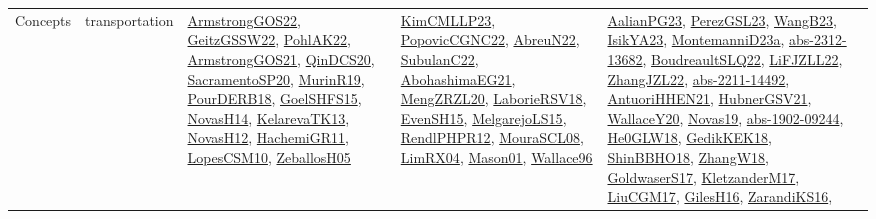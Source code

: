 {\begin{longtable}{llp{6cm}p{6cm}p{6cm}}
Concepts & transportation & \href{papers/ArmstrongGOS22.pdf}{ArmstrongGOS22}\cite{ArmstrongGOS22}, \href{papers/GeitzGSSW22.pdf}{GeitzGSSW22}\cite{GeitzGSSW22}, \href{articles/PohlAK22.pdf}{PohlAK22}\cite{PohlAK22}, \href{papers/ArmstrongGOS21.pdf}{ArmstrongGOS21}\cite{ArmstrongGOS21}, \href{articles/QinDCS20.pdf}{QinDCS20}\cite{QinDCS20}, \href{articles/SacramentoSP20.pdf}{SacramentoSP20}\cite{SacramentoSP20}, \href{papers/MurinR19.pdf}{MurinR19}\cite{MurinR19}, \href{articles/PourDERB18.pdf}{PourDERB18}\cite{PourDERB18}, \href{articles/GoelSHFS15.pdf}{GoelSHFS15}\cite{GoelSHFS15}, \href{articles/NovasH14.pdf}{NovasH14}\cite{NovasH14}, \href{papers/KelarevaTK13.pdf}{KelarevaTK13}\cite{KelarevaTK13}, \href{articles/NovasH12.pdf}{NovasH12}\cite{NovasH12}, \href{articles/HachemiGR11.pdf}{HachemiGR11}\cite{HachemiGR11}, \href{articles/LopesCSM10.pdf}{LopesCSM10}\cite{LopesCSM10}, \href{articles/ZeballosH05.pdf}{ZeballosH05}\cite{ZeballosH05} & \href{papers/KimCMLLP23.pdf}{KimCMLLP23}\cite{KimCMLLP23}, \href{papers/PopovicCGNC22.pdf}{PopovicCGNC22}\cite{PopovicCGNC22}, \href{articles/AbreuN22.pdf}{AbreuN22}\cite{AbreuN22}, \href{articles/SubulanC22.pdf}{SubulanC22}\cite{SubulanC22}, \href{articles/AbohashimaEG21.pdf}{AbohashimaEG21}\cite{AbohashimaEG21}, \href{articles/MengZRZL20.pdf}{MengZRZL20}\cite{MengZRZL20}, \href{articles/LaborieRSV18.pdf}{LaborieRSV18}\cite{LaborieRSV18}, \href{papers/EvenSH15.pdf}{EvenSH15}\cite{EvenSH15}, \href{papers/MelgarejoLS15.pdf}{MelgarejoLS15}\cite{MelgarejoLS15}, \href{papers/RendlPHPR12.pdf}{RendlPHPR12}\cite{RendlPHPR12}, \href{papers/MouraSCL08.pdf}{MouraSCL08}\cite{MouraSCL08}, \href{papers/LimRX04.pdf}{LimRX04}\cite{LimRX04}, \href{articles/Mason01.pdf}{Mason01}\cite{Mason01}, \href{articles/Wallace96.pdf}{Wallace96}\cite{Wallace96} & \href{papers/AalianPG23.pdf}{AalianPG23}\cite{AalianPG23}, \href{papers/PerezGSL23.pdf}{PerezGSL23}\cite{PerezGSL23}, \href{papers/WangB23.pdf}{WangB23}\cite{WangB23}, \href{articles/IsikYA23.pdf}{IsikYA23}\cite{IsikYA23}, \href{articles/MontemanniD23a.pdf}{MontemanniD23a}\cite{MontemanniD23a}, \href{articles/abs-2312-13682.pdf}{abs-2312-13682}\cite{abs-2312-13682}, \href{papers/BoudreaultSLQ22.pdf}{BoudreaultSLQ22}\cite{BoudreaultSLQ22}, \href{papers/LiFJZLL22.pdf}{LiFJZLL22}\cite{LiFJZLL22}, \href{papers/ZhangJZL22.pdf}{ZhangJZL22}\cite{ZhangJZL22}, \href{articles/abs-2211-14492.pdf}{abs-2211-14492}\cite{abs-2211-14492}, \href{papers/AntuoriHHEN21.pdf}{AntuoriHHEN21}\cite{AntuoriHHEN21}, \href{articles/HubnerGSV21.pdf}{HubnerGSV21}\cite{HubnerGSV21}, \href{articles/WallaceY20.pdf}{WallaceY20}\cite{WallaceY20}, \href{articles/Novas19.pdf}{Novas19}\cite{Novas19}, \href{articles/abs-1902-09244.pdf}{abs-1902-09244}\cite{abs-1902-09244}, \href{papers/He0GLW18.pdf}{He0GLW18}\cite{He0GLW18}, \href{articles/GedikKEK18.pdf}{GedikKEK18}\cite{GedikKEK18}, \href{articles/ShinBBHO18.pdf}{ShinBBHO18}\cite{ShinBBHO18}, \href{articles/ZhangW18.pdf}{ZhangW18}\cite{ZhangW18}, \href{papers/GoldwaserS17.pdf}{GoldwaserS17}\cite{GoldwaserS17}, \href{papers/KletzanderM17.pdf}{KletzanderM17}\cite{KletzanderM17}, \href{papers/LiuCGM17.pdf}{LiuCGM17}\cite{LiuCGM17}, \href{papers/GilesH16.pdf}{GilesH16}\cite{GilesH16}, \href{articles/ZarandiKS16.pdf}{ZarandiKS16}\cite{ZarandiKS16}, 
\end{longtable}}

